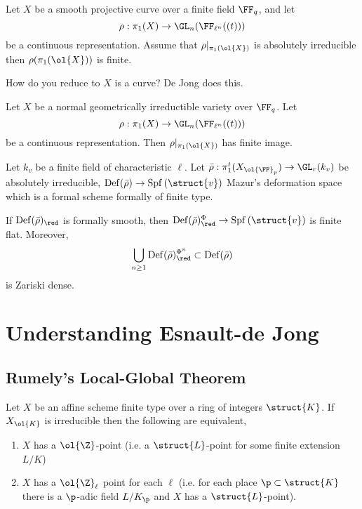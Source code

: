 \documentclass{article}
\newcommand{\Def}{\mathrm{Def}}
\newcommand{\Spf}[1]{\mathrm{Spf}\left( #1 \right)}
\begin{document}
Let $X$ be a smooth projective curve over a finite field $\FF_q$, and let 
\[ \rho : \pi_1(X) \to \GL_n(\FF_{\ell^n}((t))) \]
be a continuous representation. Assume that $\rho|_{\pi_1(\ol{X})}$ is absolutely irreducible then $\rho(\pi_1(\ol{X}))$ is finite. 

\begin{rmk}
How do you reduce to $X$ is a curve? De Jong does this.
\end{rmk}

\begin{theorem}
Let $X$ be a normal geometrically irreductible variety over $\FF_q$. Let
\[ \rho : \pi_1(X) \to \GL_n(\FF_{\ell^n}((t))) \]
be a continuous representation. Then $\rho|_{\pi_1(\ol{X})}$ has finite image.
\end{theorem}

Let $k_v$ be a finite field of characteristic $\ell$. Let $\bar{\rho} : \pi^t_1(X_{\ol{\FF}_p}) \to \GL_r(k_v)$ be absolutely irreducible, $\Def(\bar{\rho}) \to \Spf{\struct{v}}$ Mazur's deformation space which is a formal scheme formally of finite type. 

\begin{theorem}
If $\Def(\bar{\rho})_{\red}$ is formally smooth, then $\Def(\bar{\rho})_{\red}^{\Phi} \to \Spf{\struct{v}}$ is finite flat. Moreover, 
\[ \bigcup_{n \ge 1} \Def(\bar{\rho})_{\red}^{\Phi^n} \subset \Def(\bar{\rho}) \]
is Zariski dense. 
\end{theorem}

\section{Understanding Esnault-de Jong}

\subsection{Rumely's Local-Global Theorem}

\begin{theorem}
Let $X$ be an affine scheme finite type over a ring of integers $\struct{K}$. If $X_{\ol{K}}$ is irreducible then the following are equivalent,
\begin{enumerate}
\item $X$ has a $\ol{\Z}$-point (i.e. a $\struct{L}$-point for some finite extension $L/K$)
\item $X$ has a $\ol{\Z}_\ell$ point for each $\ell$ (i.e. for each place $\p \subset \struct{K}$ there is a $\p$-adic field $L / K_{\p}$ and $X$ has a $\struct{L}$-point).
\end{enumerate}
\end{theorem}
\end{document}
